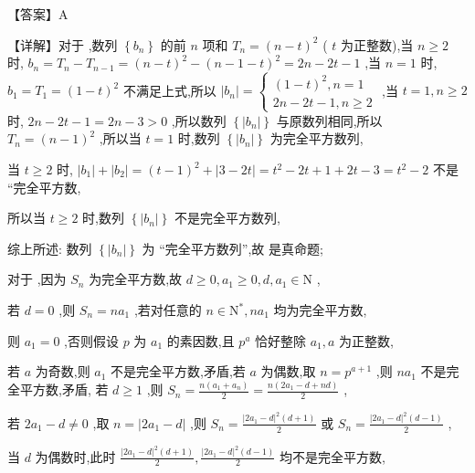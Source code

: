 \documentclass[10pt]{article}
\newcommand*\circled[1]{\tikz[baseline=(char.base)]{\node[shape=circle,draw,inner sep=1.5pt] (char) {\small #1};}}
\begin{document}
【答案】A

【详解】对于 \circled{1} ,数列 \(\left\{  {b}_{n}\right\}\) 的前 \(n\) 项和 \({T}_{n} = {\left( n - t\right) }^{2}\) ( \(t\) 为正整数),当 \(n \geq  2\) 时, \({b}_{n} = {T}_{n} - {T}_{n - 1} = {\left( n - t\right) }^{2} - {\left( n - 1 - t\right) }^{2} = {2n} - {2t} - 1\) ,当 \(n = 1\) 时, \({b}_{1} = {T}_{1} = {\left( 1 - t\right) }^{2}\) 不满足上式,所以 \(\left| {b}_{n}\right|  = \left\{  \begin{array}{l} {\left( 1 - t\right) }^{2},n = 1 \\  {2n} - {2t} - 1,n \geq  2 \end{array}\right.\) ,当 \(t = 1,n \geq  2\) 时, \({2n} - {2t} - 1 = {2n} - 3 > 0\) ,所以数列 \(\left\{  \left| {b}_{n}\right| \right\}\) 与原数列相同,所以 \({T}_{n} = {\left( n - 1\right) }^{2}\) ,所以当 \(t = 1\) 时,数列 \(\left\{  \left| {b}_{n}\right| \right\}\) 为完全平方数列,

当 \(t \geq  2\) 时, \(\left| {b}_{1}\right|  + \left| {b}_{2}\right|  = {\left( t - 1\right) }^{2} + \left| {3 - {2t}}\right|  = {t}^{2} - {2t} + 1 + {2t} - 3 = {t}^{2} - 2\) 不是 “完全平方数,

所以当 \(t \geq  2\) 时,数列 \(\left\{  \left| {b}_{n}\right| \right\}\) 不是完全平方数列,

综上所述: 数列 \(\left\{  \left| {b}_{n}\right| \right\}\) 为 “完全平方数列”,故 \circled{1} 是真命题;

对于 \circled{2} ,因为 \({S}_{n}\) 为完全平方数,故 \(d \geq  0,{a}_{1} \geq  0,d,{a}_{1} \in  \mathrm{N}\) ,

若 \(d = 0\) ,则 \({S}_{n} = n{a}_{1}\) ,若对任意的 \(n \in  {\mathrm{N}}^{ * },n{a}_{1}\) 均为完全平方数,

则 \({a}_{1} = 0\) ,否则假设 \(p\) 为 \({a}_{1}\) 的素因数,且 \({p}^{a}\) 恰好整除 \({a}_{1},a\) 为正整数,

若 \(a\) 为奇数,则 \({a}_{1}\) 不是完全平方数,矛盾,若 \(a\) 为偶数,取 \(n = {p}^{a + 1}\) ,则 \(n{a}_{1}\) 不是完全平方数,矛盾, 若 \(d \geq  1\) ,则 \({S}_{n} = \frac{n\left( {{a}_{1} + {a}_{n}}\right) }{2} = \frac{n\left( {2{a}_{1} - d + {nd}}\right) }{2}\) ,

若 \(2{a}_{1} - d \neq  0\) ,取 \(n = \left| {2{a}_{1} - d}\right|\) ,则 \({S}_{n} = \frac{{\left| 2{a}_{1} - d\right| }^{2}\left( {d + 1}\right) }{2}\) 或 \({S}_{n} = \frac{{\left| 2{a}_{1} - d\right| }^{2}\left( {d - 1}\right) }{2}\) ,

当 \(d\) 为偶数时,此时 \(\frac{{\left| 2{a}_{1} - d\right| }^{2}\left( {d + 1}\right) }{2},\frac{{\left| 2{a}_{1} - d\right| }^{2}\left( {d - 1}\right) }{2}\) 均不是完全平方数,
\end{document}
